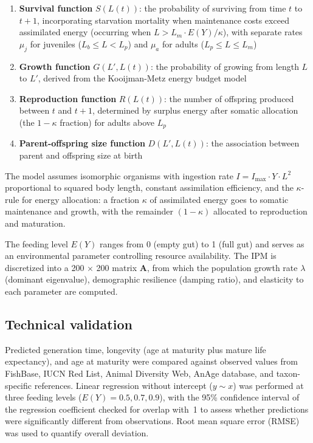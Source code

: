 \documentclass[11pt]{article}
\begin{document}
\begin{enumerate}
    \item \textbf{Survival function} $S(L(t))$: the probability of surviving from time $t$ to $t+1$, incorporating starvation mortality when maintenance costs exceed assimilated energy (occurring when $L > L_m \cdot E(Y) / \kappa$), with separate rates $\mu_j$ for juveniles ($L_b \leq L < L_p$) and $\mu_a$ for adults ($L_p \leq L \leq L_m$)
    \item \textbf{Growth function} $G(L', L(t))$: the probability of growing from length $L$ to $L'$, derived from the Kooijman-Metz energy budget model
    \item \textbf{Reproduction function} $R(L(t))$: the number of offspring produced between $t$ and $t+1$, determined by surplus energy after somatic allocation (the $1-\kappa$ fraction) for adults above $L_p$
    \item \textbf{Parent-offspring size function} $D(L', L(t))$: the association between parent and offspring size at birth
\end{enumerate}

The model assumes isomorphic organisms with ingestion rate $I = I_{\max} \cdot Y \cdot L^2$ proportional to squared body length, constant assimilation efficiency, and the $\kappa$-rule for energy allocation: a fraction $\kappa$ of assimilated energy goes to somatic maintenance and growth, with the remainder $(1-\kappa)$ allocated to reproduction and maturation.

The feeding level $E(Y)$ ranges from 0 (empty gut) to 1 (full gut) and serves as an environmental parameter controlling resource availability. The IPM is discretized into a 200 $\times$ 200 matrix $\mathbf{A}$, from which the population growth rate $\lambda$ (dominant eigenvalue), demographic resilience (damping ratio), and elasticity to each parameter are computed.

\subsection{Technical validation}

Predicted generation time, longevity (age at maturity plus mature life expectancy), and age at maturity were compared against observed values from FishBase, IUCN Red List, Animal Diversity Web, AnAge database, and taxon-specific references. Linear regression without intercept ($y \sim x$) was performed at three feeding levels ($E(Y) = 0.5, 0.7, 0.9$), with the 95\% confidence interval of the regression coefficient checked for overlap with~1 to assess whether predictions were significantly different from observations. Root mean square error (RMSE) was used to quantify overall deviation.
\end{document}

